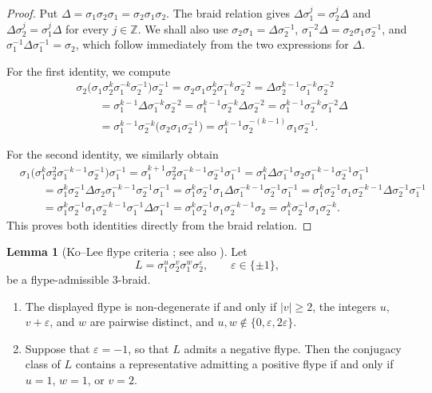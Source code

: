 \documentclass[11pt]{article}
\theoremstyle{definition}
\newtheorem{lemma}[lemma]{Lemma}
\begin{document}
\begin{proof}
Put $\Delta=\sigma_1\sigma_2\sigma_1=\sigma_2\sigma_1\sigma_2$. The braid relation gives $\Delta\sigma_1^j=\sigma_2^j\Delta$ and $\Delta\sigma_2^j=\sigma_1^j\Delta$ for every $j\in\mathbb Z$. We shall also use $\sigma_2\sigma_1=\Delta\sigma_2^{-1}$, $\sigma_1^{-2}\Delta=\sigma_2\sigma_1\sigma_2^{-1}$, and $\sigma_1^{-1}\Delta\sigma_1^{-1}=\sigma_2$, which follow immediately from the two expressions for $\Delta$.

For the first identity, we compute
\begin{align*}
&\sigma_2
 \bigl(\sigma_1\sigma_2^k\sigma_1^{-k}\sigma_2^{-1}\bigr)
 \sigma_2^{-1}
=\sigma_2\sigma_1\sigma_2^k\sigma_1^{-k}\sigma_2^{-2}
=\Delta\sigma_2^{k-1}\sigma_1^{-k}\sigma_2^{-2}\\
&\qquad
=\sigma_1^{k-1}\Delta\sigma_1^{-k}\sigma_2^{-2}
=\sigma_1^{k-1}\sigma_2^{-k}\Delta\sigma_2^{-2}
=\sigma_1^{k-1}\sigma_2^{-k}\sigma_1^{-2}\Delta\\
&\qquad
=\sigma_1^{k-1}\sigma_2^{-k}
 \bigl(\sigma_2\sigma_1\sigma_2^{-1}\bigr)
=\sigma_1^{k-1}\sigma_2^{-(k-1)}\sigma_1\sigma_2^{-1}.
\end{align*}

For the second identity, we similarly obtain
\begin{align*}
&\sigma_1
 \bigl(\sigma_1^k\sigma_2^2\sigma_1^{-k-1}\sigma_2^{-1}\bigr)
 \sigma_1^{-1}
=\sigma_1^{k+1}\sigma_2^2\sigma_1^{-k-1}\sigma_2^{-1}\sigma_1^{-1}
=\sigma_1^k\Delta\sigma_1^{-1}\sigma_2
 \sigma_1^{-k-1}\sigma_2^{-1}\sigma_1^{-1}\\
&\qquad
=\sigma_1^k\sigma_2^{-1}\Delta\sigma_2
 \sigma_1^{-k-1}\sigma_2^{-1}\sigma_1^{-1}
=\sigma_1^k\sigma_2^{-1}\sigma_1\Delta
 \sigma_1^{-k-1}\sigma_2^{-1}\sigma_1^{-1}
=\sigma_1^k\sigma_2^{-1}\sigma_1\sigma_2^{-k-1}
 \Delta\sigma_2^{-1}\sigma_1^{-1}\\
&\qquad
=\sigma_1^k\sigma_2^{-1}\sigma_1\sigma_2^{-k-1}
 \sigma_1^{-1}\Delta\sigma_1^{-1}
=\sigma_1^k\sigma_2^{-1}\sigma_1\sigma_2^{-k-1}\sigma_2
=\sigma_1^k\sigma_2^{-1}\sigma_1\sigma_2^{-k}.
\end{align*}
This proves both identities directly from the braid relation.
\end{proof}

\begin{lemma}[Ko--Lee flype criteria
{\cite{KoLee1999}; see also \cite[Lemma~1]{BM2008}}]
\label{lem:kolee-flype}
Let
\[
L=
\sigma_1^u\sigma_2^v\sigma_1^w\sigma_2^{\varepsilon},
\qquad \varepsilon\in\{\pm1\},
\]
be a flype-admissible $3$-braid.
\begin{enumerate}[label=\textup{(\alph*)}]
\item The displayed flype is non-degenerate if and only if $|v|\ge2$, the integers $u$, $v+\varepsilon$, and $w$ are pairwise distinct, and $u,w\notin\{0,\varepsilon,2\varepsilon\}$.
\item Suppose that $\varepsilon=-1$, so that $L$ admits a negative flype. Then the conjugacy class of $L$ contains a representative admitting a positive flype if and only if $u=1$, $w=1$, or $v=2$.
\end{enumerate}
\end{lemma}
\end{document}
